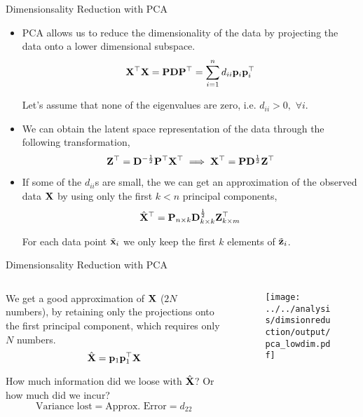 \documentclass[aspectratio=169]{beamer}
\let\olditem\item
\renewcommand{\item}{\setlength{\itemsep}{\fill}\olditem}
\def\mf{\ensuremath\mathbf}
\begin{document}
\begin{frame}[t]{Dimensionsality Reduction with PCA}
  \begin{itemize}
  \item PCA allows us to reduce the dimensionality of the data by projecting the data onto a lower dimensional subspace.
  \[ \mf{X}^\top \mf{X} = \mf{P}\mf{D}\mf{P}^\top = \sum_{i=1}^n d_{ii} \mf{p}_i\mf{p}_i^\top \]
  
  Let's assume that none of the eigenvalues are zero, i.e. $d_{ii} > 0, \,\, \forall i$.

  \item We can obtain the latent space representation of the data through the following transformation,
  \[ \mf{Z}^\top = \mf{D}^{-\frac{1}{2}}\mf{P}^{\top}\mf{X}^{\top} \implies \mf{X}^\top = \mf{P}\mf{D}^{\frac{1}{2}}\mf{Z}^{\top} \]

  \item If some of the $d_{ii}$s are small, the we can get an approximation of the observed data $\mf{X}$ by using only the first $k < n$ principal components,
  \[ \hat{\mf{X}}^\top = \mf{P}_{n \times k}\mf{D}_{k \times k}^{\frac{1}{2}}\mf{Z}_{k \times m}^{\top} \]
  
  For each data point $\tilde{\mf{x}}_i$ we only keep the first $k$ elements of $\tilde{\mf{z}}_i$.
  
\end{itemize}
\end{frame}


\begin{frame}[t]{Dimensionsality Reduction with PCA}
  \begin{columns}
    \begin{column}{0.45\textwidth}
      We get a good approximation of $\mf{X}$ ($2N$ numbers), by retaining only the projections onto the first principal component, which requires only $N$ numbers.
      \[ \hat{\mf{X}} = \mf{p}_1\mf{p}_1^\top\mf{X} \]
      
      \vspace{0.5cm}
      
      How much information did we loose with $\hat{\mf{X}}$? Or how much did we incur?
      \[ \text{Variance lost} = \text{Approx. Error} = d_{22} \]
    \end{column}
    \begin{column}{0.5\textwidth}
      \begin{figure}
        \centering
        \texttt{[image: ../../analysis/dimsionreduction/output/pca\_lowdim.pdf]}
      \end{figure}
    \end{column}
  \end{columns}
\end{frame}
\end{document}

